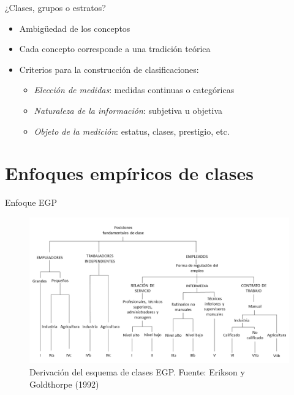 \documentclass[
  spanish,
  ignorenonframetext,
]{beamer}
\providecommand{\tightlist}{%
  \setlength{\itemsep}{0pt}\setlength{\parskip}{0pt}}
\begin{document}
\begin{frame}{¿Clases, grupos o estratos?}
\protect\hypertarget{clases-grupos-o-estratos}{}
\begin{itemize}
\tightlist
\item
  Ambigüedad de los conceptos\\
\item
  Cada concepto corresponde a una tradición teórica\\
\item
  Criterios para la construcción de clasificaciones:

  \begin{itemize}
  \tightlist
  \item
    \emph{Elección de medidas}: medidas continuas o categóricas\\
  \item
    \emph{Naturaleza de la información}: subjetiva u objetiva\\
  \item
    \emph{Objeto de la medición}: estatus, clases, prestigio, etc.
  \end{itemize}
\end{itemize}
\end{frame}

\hypertarget{enfoques-empuxedricos-de-clases}{%
\section{Enfoques empíricos de
clases}\label{enfoques-empuxedricos-de-clases}}

\begin{frame}{Enfoque EGP}
\protect\hypertarget{enfoque-egp}{}
\begin{figure}

{\centering \includegraphics[width=0.85\linewidth]{imagenes/esquema_egp} 

}

\caption{Derivación del esquema de clases EGP. Fuente: Erikson y Goldthorpe (1992)}\label{fig:unnamed-chunk-1}
\end{figure}
\end{frame}
\end{document}
